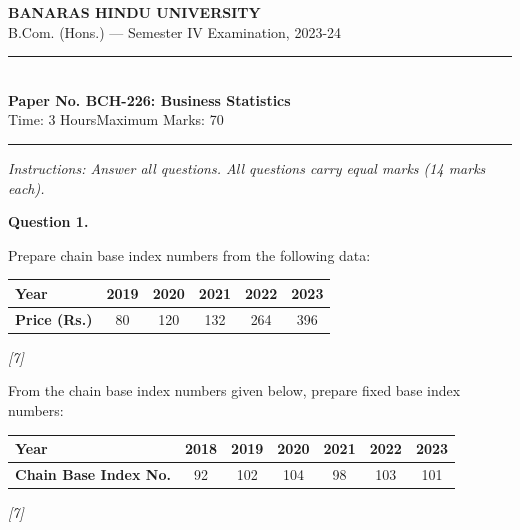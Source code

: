 \documentclass[11pt,a4paper]{article}
\newcommand{\pts}[1]{\hfill   \textit{[#1]}}
\begin{document}
\begin{center}
  {\large\bfseries BANARAS HINDU UNIVERSITY}\\[2pt]
  {\normalsize B.Com. (Hons.) --- Semester IV Examination, 2023-24}\\[6pt]
  \rule{0.8\linewidth}{0.5pt}\\[6pt]
  {\large\bfseries Paper No. BCH-226: Business Statistics}\\[4pt]
  {\normalsize Time: 3 Hours\hfill Maximum Marks: 70}
\end{center}

\rule{\linewidth}{0.4pt}

\smallskip



\noindent   \textit{Instructions: Answer all questions. All questions carry equal marks (14 marks each).}

\bigskip




\noindent   \textbf{Question 1.}

\begin{parts}
  \item Prepare chain base index numbers from the following data:
  
\begin{center}
  \small
  
\begin{tabular}{|l|c|c|c|c|c|}
  \hline
   \textbf{Year} & 2019 & 2020 & 2021 & 2022 & 2023 \\
  \hline
   \textbf{Price (Rs.)} & 80 & 120 & 132 & 264 & 396 \\
  \hline
  \end{tabular}
  \end{center}\pts{7}
  
  \item From the chain base index numbers given below, prepare fixed base index numbers:
  
\begin{center}
  \small
  
\begin{tabular}{|l|c|c|c|c|c|c|}
  \hline
   \textbf{Year} & 2018 & 2019 & 2020 & 2021 & 2022 & 2023 \\
  \hline
   \textbf{Chain Base Index No.} & 92 & 102 & 104 & 98 & 103 & 101 \\
  \hline
  \end{tabular}
  \end{center}\pts{7}
\end{parts}
\end{document}
